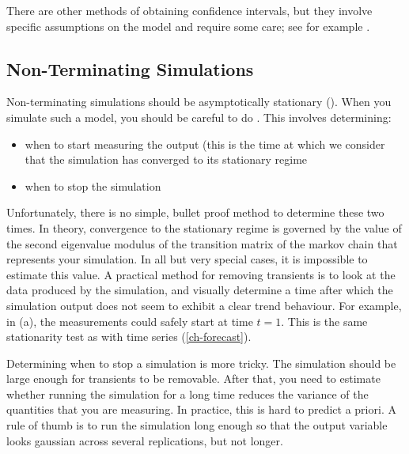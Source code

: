 There are other methods of obtaining confidence intervals, but
they involve specific assumptions on the model and require some
care; see for example \cite{law2000simulation}.

\subsection{Non-Terminating Simulations}
Non-terminating simulations should be asymptotically stationary
(). When you simulate such a model, you should
be careful to do . This involves
determining:
\begin{itemize}
    \item when to start measuring the output (this is the time at
    which we consider that the simulation has converged to its
    stationary regime
    \item when to stop the simulation
\end{itemize}
%
Unfortunately, there is no simple, bullet proof method to
determine these two times. In theory, convergence to the
stationary regime is governed by the value of the second
eigenvalue modulus of the transition matrix of the markov chain
that represents your simulation. In all but very special cases,
it is impossible to estimate this value. A practical method for
removing transients is to look at the data produced by the
simulation, and visually determine a time after which the
simulation output does not seem to exhibit a clear trend
behaviour. For example, in  (a), the
measurements could safely start at time  $t=1$. This is the
same stationarity test as with time series
(\cref{ch-forecast}).

Determining when to stop a simulation is more tricky. The
simulation should be large enough for transients to be
removable. After that, you need to estimate whether running the
simulation for a long time reduces the variance of the
quantities that you are measuring. In practice, this is hard to
predict a priori. A rule of thumb is to run the simulation long
enough so that the output variable looks gaussian across
several replications, but not longer.

%
%
%
%
%
%
